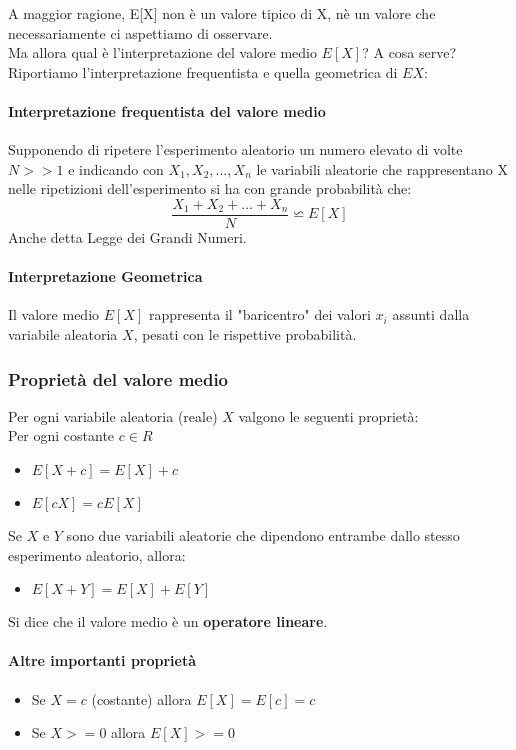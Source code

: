 	A maggior ragione, E[X] non è un valore tipico di X, nè un valore che necessariamente
	ci aspettiamo di osservare.
	\\ Ma allora qual è l'interpretazione del valore medio $E[X]$? A cosa serve?
	Riportiamo l'interpretazione frequentista e quella geometrica di $E{X}$:
	\paragraph{Interpretazione frequentista del valore medio}
	Supponendo di ripetere l'esperimento aleatorio un numero elevato di volte $N >> 1$
	e indicando con $X_1, X_2, \dots, X_n$ le variabili aleatorie che rappresentano X nelle
	ripetizioni dell'esperimento si ha con grande probabilità che:
	\[
		\frac{X_1 + X_2 + \dots + X_n}{N} \backsimeq  E[X]
	\]
	Anche detta Legge dei Grandi Numeri.

	\paragraph{Interpretazione Geometrica}
	Il valore medio $E[X]$ rappresenta il "baricentro" dei valori $x_i$ assunti dalla variabile aleatoria $X$, pesati
	con le rispettive probabilità.

	\subsubsection{Proprietà del valore medio}
	Per ogni variabile aleatoria (reale) $X$ valgono le seguenti proprietà:
	\\Per ogni costante $c \in R$
	\begin{itemize}
		\item $E[X + c] = E[X] + c$
		\item $E[cX] = c E[X]$
	\end{itemize}
	Se $X$ e $Y$ sono due variabili aleatorie che dipendono entrambe dallo
	stesso esperimento aleatorio, allora:
	\begin{itemize}
		\item $E[X+Y] = E[X] + E[Y]$
	\end{itemize}
	Si dice che il valore medio è un\textbf{ operatore lineare}.

	\paragraph{Altre importanti proprietà}
	\begin{itemize}
		\item Se $X = c$ (costante) allora $E[X] = E[c] = c$
		\item Se $X >= 0$ allora $E[X] >= 0$
	\end{itemize}

